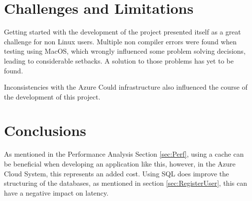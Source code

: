 \documentclass[10pt,a4paper,twocolumn]{article}
\begin{document}
\section{Challenges and Limitations}
\label{sec: challengesLimit}
\par Getting started with the development of the project presented itself as a great challenge for non Linux users. Multiple non compiler errors were found when testing using MacOS, which wrongly influenced some problem solving decisions, leading to considerable setbacks. A solution to those problems has yet to be found.
\par Inconsistencies with the Azure Could infrastructure also influenced the course of the development of this project.

\section {Conclusions}
\label{sec:Conc}
As mentioned in the Performance Analysis Section \ref{sec:Perf}, using a cache can be beneficial when developing an application like this, however, in the Azure Cloud System, this represents an added cost. Using SQL does improve the structuring of the databases, as mentioned in section \ref{sec:RegisterUser}, this can have a negative impact on latency\cite{sqlNOSQLPerformance}.



\end{document}
